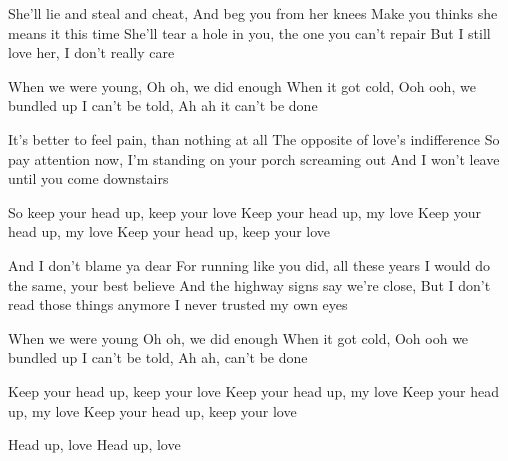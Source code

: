 \resetVars%
%
%
%
%
\MakeHeader%
\Lyrics%
She'll lie and steal and cheat,
And beg you from her knees
Make you thinks she means it this time
She'll tear a hole in you, the one you can't repair
But I still love her, I don't really care

When we were young,
Oh oh, we did enough
When it got cold,
Ooh ooh, we bundled up
I can't be told,
Ah ah it can't be done

It's better to feel pain, than nothing at all
The opposite of love's indifference
So pay attention now,
I'm standing on your porch screaming out
And I won't leave until you come downstairs

So keep your head up, keep your love
Keep your head up, my love
Keep your head up, my love
Keep your head up, keep your love

And I don't blame ya dear
For running like you did, all these years
I would do the same, your best believe
And the highway signs say we're close,
But I don't read those things anymore
I never trusted my own eyes

When we were young
Oh oh, we did enough
When it got cold,
Ooh ooh we bundled up
I can't be told,
Ah ah, can't be done

Keep your head up, keep your love
Keep your head up, my love
Keep your head up, my love
Keep your head up, keep your love

Head up, love
Head up, love
\StrummingStart%
%
\Down\UpMiss\DownMiss\Up\Down\Up%
\StrummingEnd%

\Next
